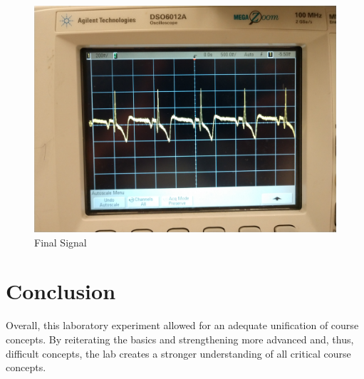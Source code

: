 \documentclass[
	letterpaper, %
	10pt, %
]{CSUniSchoolLabReport}
\begin{document}
\begin{figure}[H]
  \centering
  \includegraphics[width=.9\textwidth]{Figures/L15.jpg}
  \caption{Final Signal}
  \label{fig:7}
\end{figure}

\section{Conclusion}

Overall, this laboratory experiment allowed for an adequate unification of course concepts. By reiterating the basics and strengthening more advanced and, thus, difficult concepts, the lab creates a stronger understanding of all critical course concepts.
\end{document}
